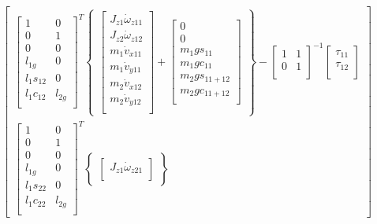 \documentclass[12pt,a4paper]{article}
\begin{document}
\begin{equation}
\begin{bmatrix}
	\begin{bmatrix}
	1 & 0 \\
	0 & 1 \\
	0 & 0 \\
	l_{1g} & 0\\
	l_1 s_{12} & 0 \\
	l_1 c_{12} & l_{2g} \\
	\end{bmatrix}^T
	\begin{Bmatrix}
		\begin{bmatrix}
		J_{z1} \dot{\omega}_{z11} \\
		J_{z2} \dot{\omega}_{z12} \\
		m_1 \dot{v}_{x11} \\ 
		m_1 \dot{v}_{y11} \\
		m_2 \dot{v}_{x12} \\
		m_2 \dot{v}_{y12} \\
		\end{bmatrix}
		+
		\begin{bmatrix}
		0 \\
		0 \\
		m_1 g s_{11} \\
		m_1 g c_{11} \\
		m_2 g s_{11+12} \\
		m_2 g c_{11+12} \\
		\end{bmatrix}
	\end{Bmatrix}
	-
	\begin{bmatrix}
	1 & 1 \\
	0 & 1 \\
	\end{bmatrix}^{-1}
	\begin{bmatrix}
	\tau_{11} \\
	\tau_{12} \\
	\end{bmatrix}
	 \\	
	\begin{bmatrix}
	1 & 0 \\
	0 & 1 \\
	0 & 0 \\
	l_{1g} & 0\\
	l_1 s_{22} & 0 \\
	l_1 c_{22} & l_{2g} \\
	\end{bmatrix}^T
	\begin{Bmatrix}
		\begin{bmatrix}
		J_{z1} \dot{\omega}_{z21} \\

\end{bmatrix}
\end{Bmatrix}
\end{bmatrix}
\end{equation}
\end{document}
